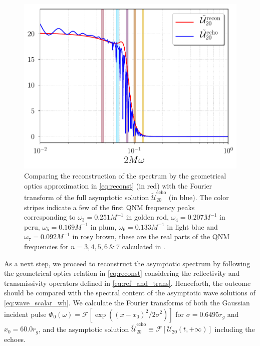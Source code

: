 \documentclass[article,aps,nofootinbib,twocolumn,superscriptaddress]{revtex4-1}
\begin{document}
\begin{figure}[t!]
\centering
\includegraphics[width=.45\textwidth]{figures/Reconst_omega_scalar.pdf}
\caption{\label{fig:rec_scalar} Comparing the reconstruction of the spectrum by the geometrical optics approximation in \eqref{eq:reconst} (in red) with the Fourier transform of the full asymptotic solution $\tilde{\mathcal{U}}_{20}^{\mathrm{echo}}$ (in blue). The color stripes indicate a few of the first QNM frequency peaks corresponding to $\omega_3=0.251M^{-1}$ in golden rod, $\omega_4=0.207M^{-1}$ in peru, $\omega_5=0.169M^{-1}$ in plum, $\omega_6=0.133M^{-1}$ in light blue and $\omega_7=0.092M^{-1}$ in rosy brown, these are the real parts of the QNM frequencies for $n=3,4,5,6~\&~7$ calculated in \citep{PhysRevD.46.4179}.}
\end{figure} 

As a next step, we proceed to reconstruct the asymptotic spectrum by following the geometrical optics relation in \eqref{eq:reconst} considering the reflectivity and transmissivity operators defined in \eqref{eq:ref_and_trans}. Henceforth, the outcome should be compared with the spectral content of the asymptotic wave solutions of \eqref{eq:wave_scalar_wh}. We calculate the Fourier transforms of both the Gaussian incident pulse $\Phi_0(\omega)=\mathcal{F}[\exp\left((x-x_0)^2/2\sigma^2\right)]$ for $\sigma=0.6495r_g$ and $x_0=60.0r_g$, and the asymptotic solution $\tilde{\mathcal{U}}_{20}^{\mathrm{echo}}\equiv\mathcal{F}[\mathcal{U}_{20}(t,+\infty)]$ including the echoes.\\
\end{document}
